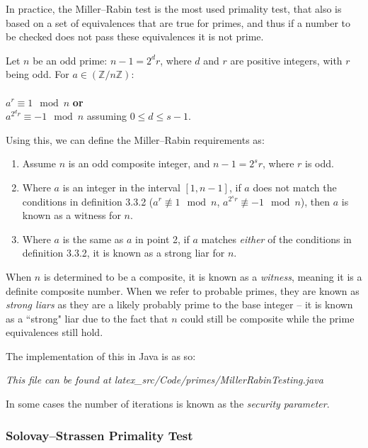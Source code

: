     In practice, the Miller--Rabin test is the most used primality test, that also is based on a set of equivalences that are true for primes, and thus if a number to be checked does not pass these equivalences it is not prime. \\
    
    \begin{mathdef}
      Let $n$ be an odd prime: $n - 1 = 2^dr$, where $d$ and $r$ are positive integers, with $r$ being odd. For $a \in (\mathbb{Z}/n\mathbb{Z})$: \\ \\
      $a^r \equiv 1 \mod{n}$ \textbf{or} \\
      $a^{2^dr} \equiv -1 \mod{n}$ assuming $0 \leq d \leq s - 1$.
    \end{mathdef}
    
    Using this, we can define the Miller--Rabin requirements as:
    
    \begin{enumerate}
      \item Assume $n$ is an odd composite integer, and $n - 1 = 2^sr$, where $r$ is odd.
      \item Where $a$ is an integer in the interval $[1,n-1]$, if $a$ does not match the conditions in definition 3.3.2 ($a^r \not\equiv1 \mod{n}$,  $a^{2^sr} \not\equiv -1 \mod{n}$), then $a$ is known as a witness for $n$.
      \item Where $a$ is the same as $a$ in point 2, if $a$ matches \emph{either} of the conditions in definition 3.3.2, it is known as a strong liar for $n$.
    \end{enumerate}
    
    When $n$ is determined to be a composite, it is known as a \emph{witness}, meaning it is a definite composite number. When we refer to probable primes, they are known as \emph{strong liars} as they are a likely probably prime to the base integer -- it is known as a ``strong" liar due to the fact that $n$ could still be composite while the prime equivalences still hold.
    
    The implementation of this in Java is as so:
    
    
    \emph{This file can be found at latex\_src/Code/primes/MillerRabinTesting.java}
    
    In some cases the number of iterations is known as the \emph{security parameter}.
    
    \subsubsection{Solovay--Strassen Primality Test}
    
